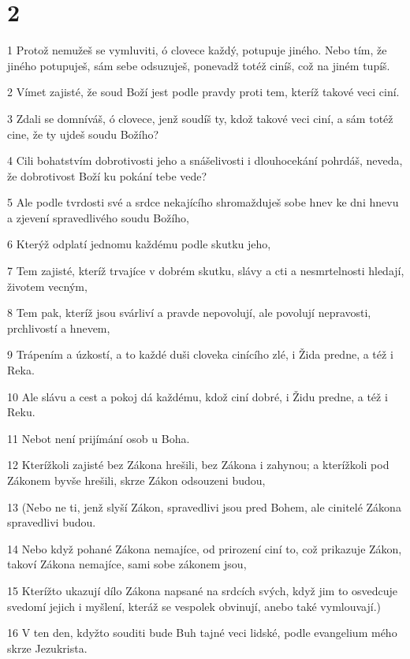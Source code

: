 \chapter{2}

\par 1 Protož nemužeš se vymluviti, ó clovece každý, potupuje jiného. Nebo tím, že jiného potupuješ, sám sebe odsuzuješ, ponevadž totéž ciníš, což na jiném tupíš.
\par 2 Vímet zajisté, že soud Boží jest podle pravdy proti tem, kteríž takové veci ciní.
\par 3 Zdali se domníváš, ó clovece, jenž soudíš ty, kdož takové veci ciní, a sám totéž cine, že ty ujdeš soudu Božího?
\par 4 Cili bohatstvím dobrotivosti jeho a snášelivosti i dlouhocekání pohrdáš, neveda, že dobrotivost Boží ku pokání tebe vede?
\par 5 Ale podle tvrdosti své a srdce nekajícího shromažduješ sobe hnev ke dni hnevu a zjevení spravedlivého soudu Božího,
\par 6 Kterýž odplatí jednomu každému podle skutku jeho,
\par 7 Tem zajisté, kteríž trvajíce v dobrém skutku, slávy a cti a nesmrtelnosti hledají, životem vecným,
\par 8 Tem pak, kteríž jsou svárliví a pravde nepovolují, ale povolují nepravosti, prchlivostí a hnevem,
\par 9 Trápením a úzkostí, a to každé duši cloveka cinícího zlé, i Žida predne, a též i Reka.
\par 10 Ale slávu a cest a pokoj dá každému, kdož ciní dobré, i Židu predne, a též i Reku.
\par 11 Nebot není prijímání osob u Boha.
\par 12 Kterížkoli zajisté bez Zákona hrešili, bez Zákona i zahynou; a kterížkoli pod Zákonem byvše hrešili, skrze Zákon odsouzeni budou,
\par 13 (Nebo ne ti, jenž slyší Zákon, spravedlivi jsou pred Bohem, ale cinitelé Zákona spravedlivi budou.
\par 14 Nebo když pohané Zákona nemajíce, od prirození ciní to, což prikazuje Zákon, takoví Zákona nemajíce, sami sobe zákonem jsou,
\par 15 Kterížto ukazují dílo Zákona napsané na srdcích svých, když jim to osvedcuje svedomí jejich i myšlení, kteráž se vespolek obvinují, anebo také vymlouvají.)
\par 16 V ten den, kdyžto souditi bude Buh tajné veci lidské, podle evangelium mého skrze Jezukrista.
